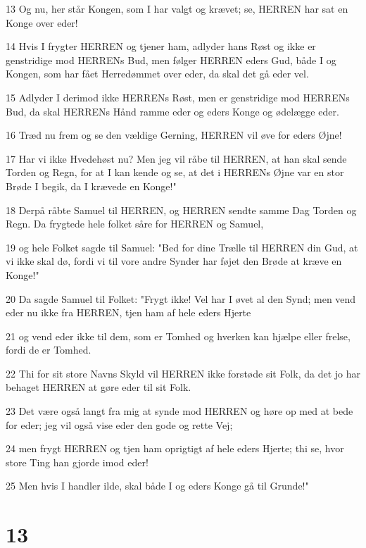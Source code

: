 \par 13 Og nu, her står Kongen, som I har valgt og krævet; se, HERREN har sat en Konge over eder!
\par 14 Hvis I frygter HERREN og tjener ham, adlyder hans Røst og ikke er genstridige mod HERRENs Bud, men følger HERREN eders Gud, både I og Kongen, som har fået Herredømmet over eder, da skal det gå eder vel.
\par 15 Adlyder I derimod ikke HERRENs Røst, men er genstridige mod HERRENs Bud, da skal HERRENs Hånd ramme eder og eders Konge og ødelægge eder.
\par 16 Træd nu frem og se den vældige Gerning, HERREN vil øve for eders Øjne!
\par 17 Har vi ikke Hvedehøst nu? Men jeg vil råbe til HERREN, at han skal sende Torden og Regn, for at I kan kende og se, at det i HERRENs Øjne var en stor Brøde I begik, da I krævede en Konge!"
\par 18 Derpå råbte Samuel til HERREN, og HERREN sendte samme Dag Torden og Regn. Da frygtede hele folket såre for HERREN og Samuel,
\par 19 og hele Folket sagde til Samuel: "Bed for dine Trælle til HERREN din Gud, at vi ikke skal dø, fordi vi til vore andre Synder har føjet den Brøde at kræve en Konge!"
\par 20 Da sagde Samuel til Folket: "Frygt ikke! Vel har I øvet al den Synd; men vend eder nu ikke fra HERREN, tjen ham af hele eders Hjerte
\par 21 og vend eder ikke til dem, som er Tomhed og hverken kan hjælpe eller frelse, fordi de er Tomhed.
\par 22 Thi for sit store Navns Skyld vil HERREN ikke forstøde sit Folk, da det jo har behaget HERREN at gøre eder til sit Folk.
\par 23 Det være også langt fra mig at synde mod HERREN og høre op med at bede for eder; jeg vil også vise eder den gode og rette Vej;
\par 24 men frygt HERREN og tjen ham oprigtigt af hele eders Hjerte; thi se, hvor store Ting han gjorde imod eder!
\par 25 Men hvis I handler ilde, skal både I og eders Konge gå til Grunde!"

\chapter{13}

